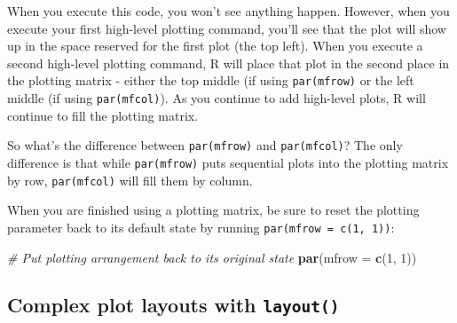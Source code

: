 \documentclass[]{book}
\newenvironment{Shaded}{\begin{snugshade}}{\end{snugshade}}
\newcommand{\KeywordTok}[1]{\textcolor[rgb]{0.13,0.29,0.53}{\textbf{#1}}}
\newcommand{\DataTypeTok}[1]{\textcolor[rgb]{0.13,0.29,0.53}{#1}}
\newcommand{\DecValTok}[1]{\textcolor[rgb]{0.00,0.00,0.81}{#1}}
\newcommand{\CommentTok}[1]{\textcolor[rgb]{0.56,0.35,0.01}{\textit{#1}}}
\newcommand{\NormalTok}[1]{#1}
\theoremstyle{definition}
\theoremstyle{definition}
\theoremstyle{remark}
\begin{document}
When you execute this code, you won't see anything happen. However, when
you execute your first high-level plotting command, you'll see that the
plot will show up in the space reserved for the first plot (the top
left). When you execute a second high-level plotting command, R will
place that plot in the second place in the plotting matrix - either the
top middle (if using \texttt{par(mfrow)} or the left middle (if using
\texttt{par(mfcol)}). As you continue to add high-level plots, R will
continue to fill the plotting matrix.

So what's the difference between \texttt{par(mfrow)} and
\texttt{par(mfcol)}? The only difference is that while
\texttt{par(mfrow)} puts sequential plots into the plotting matrix by
row, \texttt{par(mfcol)} will fill them by column.

When you are finished using a plotting matrix, be sure to reset the
plotting parameter back to its default state by running
\texttt{par(mfrow\ =\ c(1,\ 1))}:

\begin{Shaded}
\begin{Highlighting}[]
\CommentTok{# Put plotting arrangement back to its original state}
\KeywordTok{par}\NormalTok{(}\DataTypeTok{mfrow =} \KeywordTok{c}\NormalTok{(}\DecValTok{1}\NormalTok{, }\DecValTok{1}\NormalTok{))}
\end{Highlighting}
\end{Shaded}

\subsection{\texorpdfstring{Complex plot layouts with
\texttt{layout()}}{Complex plot layouts with layout()}}\label{complex-plot-layouts-with-layout}
\end{document}
